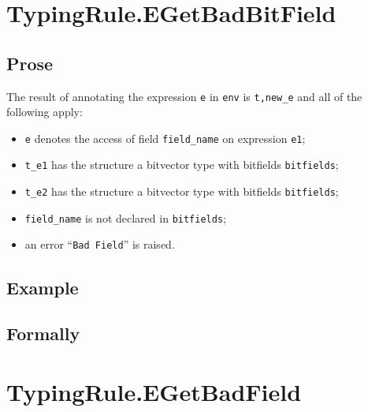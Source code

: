 \documentclass{book}
\begin{document}
\begin{itemize}
\section{TypingRule.EGetBadBitField \label{sec:TypingRule.EGetBadBitField}}

  \subsection{Prose}
  The result of annotating the expression \texttt{e} in \texttt{env} is
\texttt{t,new\_e} and all of the following apply:
  \begin{itemize}
  \item \texttt{e} denotes the access of field \texttt{field\_name} on expression \texttt{e1};
  \item \texttt{t\_e1} has the structure a bitvector type with bitfields \texttt{bitfields};
  \item \texttt{t\_e2} has the structure a bitvector type with bitfields \texttt{bitfields};
  \item \texttt{field\_name} is not declared in \texttt{bitfields};
  \item an error ``\texttt{Bad Field}'' is raised.
  \end{itemize}

  \subsection{Example}



\begin{emptyformal}
    \subsection{Formally}

\end{emptyformal}


\section{TypingRule.EGetBadField \label{sec:TypingRule.EGetBadField}}


\end{itemize}
\end{document}
